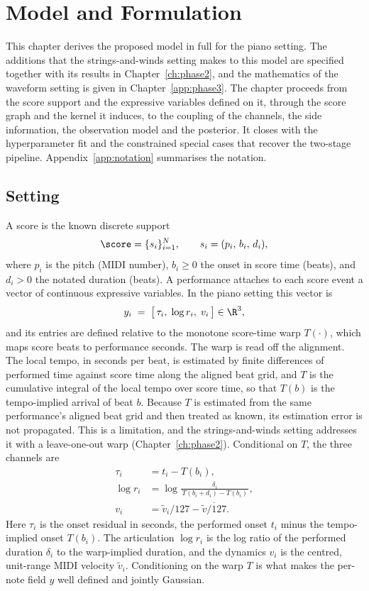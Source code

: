 \chapter{Model and Formulation}\label{ch:model}
This chapter derives the proposed model in full for the piano setting. The
additions that the strings-and-winds setting makes to this model are specified
together with its results in Chapter~\ref{ch:phase2}, and the mathematics of
the waveform setting is given in Chapter~\ref{app:phase3}. The chapter
proceeds from the score support and the expressive variables defined on it,
through the score graph and the kernel it induces, to the coupling of the
channels, the side information, the observation model and the posterior.
It closes with the hyperparameter fit and the constrained special cases that
recover the two-stage pipeline. Appendix~\ref{app:notation} summarises the
notation.

\section{Setting}
A score is the known discrete support
\begin{equation}
  \score = \{ s_i \}_{i=1}^{N}, \qquad s_i = (p_i,\, b_i,\, d_i),
  \label{eq:support}
\end{equation}
where $p_i$ is the pitch (MIDI number), $b_i \ge 0$ the onset in score time
(beats), and $d_i > 0$ the notated duration (beats). A performance attaches
to each score event a vector of continuous expressive variables. In the piano
setting this vector is
\begin{equation}
  y_i \;=\; \bigl[\, \tau_i,\; \log r_i,\; v_i \,\bigr] \in \R^{3},
  \label{eq:variables}
\end{equation}
and its entries are defined relative to the monotone score-time warp
$T(\cdot)$, which maps score beats to performance seconds. The warp is read
off the alignment. The local tempo, in seconds per beat, is estimated by
finite differences of performed time against score time along the aligned
beat grid, and $T$ is the cumulative integral of the local tempo over score
time, so that $T(b)$ is the tempo-implied arrival of beat $b$. Because $T$ is
estimated from the same performance's aligned beat grid and then treated as
known, its estimation error is not propagated. This is a limitation, and the
strings-and-winds setting addresses it with a leave-one-out warp
(Chapter~\ref{ch:phase2}). Conditional on $T$, the three channels are
\begin{align}
  \tau_i   &= t_i - T(b_i), \label{eq:tau}\\
  \log r_i &= \log \frac{\delta_i}{\,T(b_i + d_i) - T(b_i)\,}, \label{eq:logr}\\
  v_i      &= \tilde v_i / 127 - \overline{\tilde v/127}. \label{eq:vel}
\end{align}
Here $\tau_i$ is the onset residual in seconds, the performed onset $t_i$
minus the tempo-implied onset $T(b_i)$. The articulation $\log r_i$ is the
log ratio of the performed duration $\delta_i$ to the warp-implied duration,
and the dynamics $v_i$ is the centred, unit-range MIDI velocity
$\tilde v_i$. Conditioning on the warp $T$ is what makes the per-note field
$y$ well defined and jointly Gaussian.

